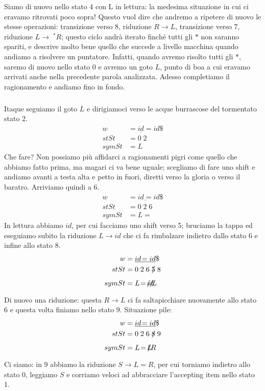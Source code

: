 \documentclass[class=book, crop=false, oneside, 12pt]{standalone}
\begin{document}
Siamo di nuovo nello stato 4 con L in lettura: la medesima situazione in cui ci eravamo ritrovati poco sopra! Questo vuol dire che andremo a ripetere di nuovo le stesse operazioni: transizione verso 8, riduzione \(R \to L\), transizione verso 7, riduzione \(L \to\; ^{*}R\); questo ciclo andrà iterato finché tutti gli \(\ast\) non saranno spariti, e descrive molto bene quello che succede a livello macchina quando andiamo a risolvere un puntatore. Infatti, quando avremo risolto tutti gli \(\ast\), saremo di nuovo nello stato 0 e avremo un goto \(L\), punto di boa a cui eravamo arrivati anche nella precedente parola analizzata. Adesso completiamo il ragionamento e andiamo fino in fondo.
\subparagraph*{}
Itaque seguiamo il goto \(L\) e dirigiamoci verso le acque burrascose del tormentato stato 2. 
\begin{align*}
    w &= \underline{id}\!=id\$ \\
    stSt &= 0\;2\\
    symSt &= L 
\end{align*}
Che fare? Non possiamo più affidarci a ragionamenti pigri come quello che abbiamo fatto prima, ma magari ci va bene uguale; scegliamo di fare uno shift e andiamo avanti a testa alta e petto in fuori, diretti verso la gloria o verso il baratro. Arriviamo quindi a 6.
\begin{align*}
    w &= \underline{id\!=}id\$ \\
    stSt &= 0\;2\;6 \\
    symSt &= L\!=
\end{align*}
In lettura abbiamo \(id\), per cui facciamo uno shift verso 5; bruciamo la tappa ed eseguiamo subito la riduzione \(L \to id\) che ci fa rimbalzare indietro dallo stato 6 e infine allo stato 8.
\begin{align*}
    w &= \underline{id\!=id}\$ \\
    stSt &= 0\;2\;6\;\xout{5}\;8 \\
    symSt &= L\!=\!\xout{id}\!L
\end{align*}
Di nuovo una riduzione: questa \(R \to L\) ci fa saltapicchiare nuovamente allo stato 6 e questa volta finiamo nello stato 9. Situazione pile:
\begin{align*}
    w &= \underline{id\!=id}\$ \\
    stSt &= 0\;2\;6\;\xout{8}\;9 \\
    symSt &= L\!=\!\xout{L}\!R
\end{align*}
Ci siamo: in 9 abbiamo la riduzione \(S \to L = R\), per cui torniamo indietro allo stato 0, leggiamo \(S\) e corriamo veloci ad abbracciare l'accepting item nello stato 1.
\end{document}
